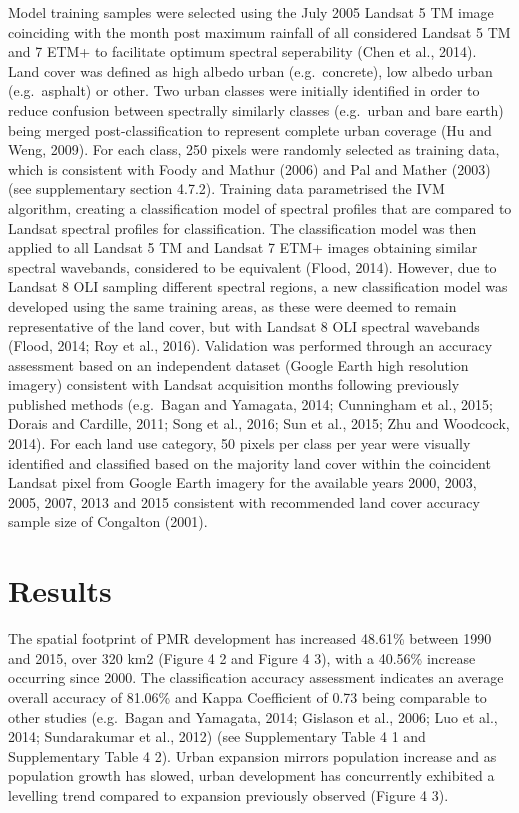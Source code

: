 \documentclass[]{book}
\begin{document}
Model training samples were selected using the July 2005 Landsat 5 TM
image coinciding with the month post maximum rainfall of all considered
Landsat 5 TM and 7 ETM+ to facilitate optimum spectral seperability
(Chen et al., 2014). Land cover was defined as high albedo urban
(e.g.~concrete), low albedo urban (e.g.~asphalt) or other. Two urban
classes were initially identified in order to reduce confusion between
spectrally similarly classes (e.g.~urban and bare earth) being merged
post-classification to represent complete urban coverage (Hu and Weng,
2009). For each class, 250 pixels were randomly selected as training
data, which is consistent with Foody and Mathur (2006) and Pal and
Mather (2003) (see supplementary section 4.7.2). Training data
parametrised the IVM algorithm, creating a classification model of
spectral profiles that are compared to Landsat spectral profiles for
classification. The classification model was then applied to all Landsat
5 TM and Landsat 7 ETM+ images obtaining similar spectral wavebands,
considered to be equivalent (Flood, 2014). However, due to Landsat 8 OLI
sampling different spectral regions, a new classification model was
developed using the same training areas, as these were deemed to remain
representative of the land cover, but with Landsat 8 OLI spectral
wavebands (Flood, 2014; Roy et al., 2016). Validation was performed
through an accuracy assessment based on an independent dataset (Google
Earth high resolution imagery) consistent with Landsat acquisition
months following previously published methods (e.g.~Bagan and Yamagata,
2014; Cunningham et al., 2015; Dorais and Cardille, 2011; Song et al.,
2016; Sun et al., 2015; Zhu and Woodcock, 2014). For each land use
category, 50 pixels per class per year were visually identified and
classified based on the majority land cover within the coincident
Landsat pixel from Google Earth imagery for the available years 2000,
2003, 2005, 2007, 2013 and 2015 consistent with recommended land cover
accuracy sample size of Congalton (2001).

\section{Results}\label{results}

The spatial footprint of PMR development has increased 48.61\% between
1990 and 2015, over 320 km2 (Figure 4 2 and Figure 4 3), with a 40.56\%
increase occurring since 2000. The classification accuracy assessment
indicates an average overall accuracy of 81.06\% and Kappa Coefficient
of 0.73 being comparable to other studies (e.g.~Bagan and Yamagata,
2014; Gislason et al., 2006; Luo et al., 2014; Sundarakumar et al.,
2012) (see Supplementary Table 4 1 and Supplementary Table 4 2). Urban
expansion mirrors population increase and as population growth has
slowed, urban development has concurrently exhibited a levelling trend
compared to expansion previously observed (Figure 4 3).
\end{document}
